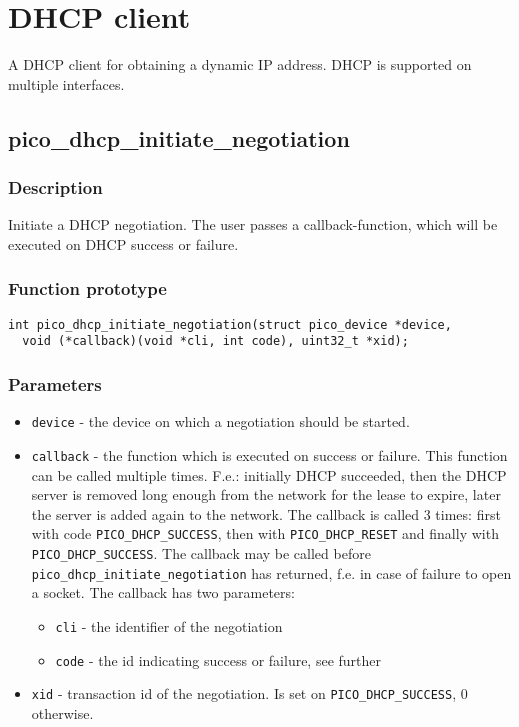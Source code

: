\section{DHCP client}

A DHCP client for obtaining a dynamic IP address. DHCP is supported on multiple interfaces.


\subsection{pico\_dhcp\_initiate\_negotiation}

\subsubsection*{Description}
Initiate a DHCP negotiation. The user passes a callback-function, which will be executed on DHCP success or failure.

\subsubsection*{Function prototype}
\begin{verbatim}
int pico_dhcp_initiate_negotiation(struct pico_device *device,
  void (*callback)(void *cli, int code), uint32_t *xid);
\end{verbatim}


\subsubsection*{Parameters}
\begin{itemize}[noitemsep]
\item \texttt{device} - the device on which a negotiation should be started.
\item \texttt{callback} - the function which is executed on success or failure. This function can be called multiple times. F.e.: initially DHCP succeeded, then the DHCP server is removed long enough from the network for the lease to expire, later the server is added again to the network. The callback is called 3 times: first with code \texttt{PICO\_DHCP\_SUCCESS}, then with \texttt{PICO\_DHCP\_RESET} and finally with \texttt{PICO\_DHCP\_SUCCESS}. The callback may be called before \texttt{pico\_dhcp\_initiate\_negotiation} has returned, f.e. in case of failure to open a socket. The callback has two parameters: 
\begin{itemize}[noitemsep]
\item \texttt{cli} - the identifier of the negotiation
\item \texttt{code} - the id indicating success or failure, see further
\end{itemize}
\item \texttt{xid} - transaction id of the negotiation. Is set on \texttt{PICO\_DHCP\_SUCCESS}, 0 otherwise.
\end{itemize}

